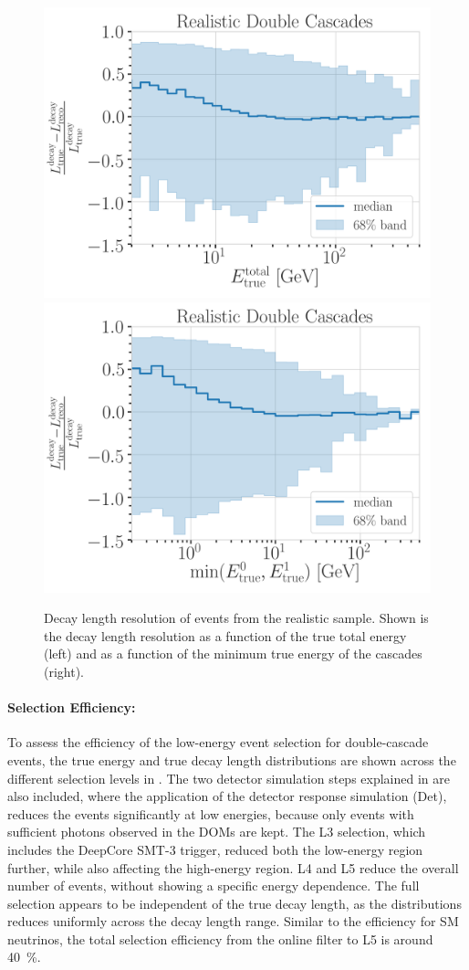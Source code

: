 \begin{figure}[h]
	\centering
    \includegraphics[width=0.49\linewidth]{figures/model_independent_simulation/results/realistic/resolutions/194603_median_decay_length_bias_vs_tot_energy_goodfit_log_unweighted.png}
    \includegraphics[width=0.49\linewidth]{figures/model_independent_simulation/results/realistic/resolutions/194603_median_decay_length_bias_vs_min_energy_goodfit_log_unweighted.png} 
    \caption[Realistic double-cascade decay length resolution versus energies]{Decay length resolution of events from the realistic sample. Shown is the decay length resolution as a function of the true total energy (left) and as a function of the minimum true energy of the cascades (right).}
\end{figure}


\paragraph{Selection Efficiency:}

To assess the efficiency of the low-energy event selection for double-cascade events, the true energy and true decay length distributions are shown across the different selection levels in . The two detector simulation steps explained in  are also included, where the application of the detector response simulation (Det), reduces the events significantly at low energies, because only events with sufficient photons observed in the DOMs are kept. The L3 selection, which includes the DeepCore SMT-3 trigger, reduced both the low-energy region further, while also affecting the high-energy region. L4 and L5 reduce the overall number of events, without showing a specific energy dependence. The full selection appears to be independent of the true decay length, as the distributions reduces uniformly across the decay length range. Similar to the efficiency for SM neutrinos, the total selection efficiency from the online filter to L5 is around \SI{40}{\percent}.

